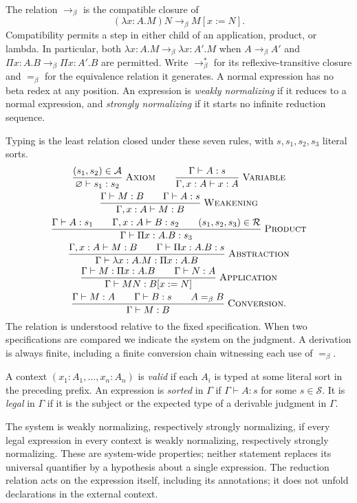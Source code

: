 \begin{definition}\label{pts:beta}
The relation $\to_\beta$ is the compatible closure of
\[
             (\lambda x:A.M)N\to_\beta M[x:=N].
\]
Compatibility permits a step in either child of an application, product,
or lambda. In particular, both
$\lambda x:A.M\to_\beta\lambda x:A'.M$ when $A\to_\beta A'$ and
$\Pi x:A.B\to_\beta\Pi x:A'.B$ are permitted.
Write $\to_\beta^*$ for its reflexive-transitive closure and
$=_\beta$ for the equivalence relation it generates. A normal expression
has no beta redex at any position. An expression is \emph{weakly
normalizing} if it reduces to a normal expression, and \emph{strongly
normalizing} if it starts no infinite reduction sequence.
\end{definition}

Typing is the least relation closed under these seven rules, with
$s,s_1,s_2,s_3$ literal sorts.
\begin{gather*}
 \frac{(s_1,s_2)\in\mathcal A}{\varnothing\vdash s_1:s_2}
 \;\textsc{Axiom}
 \qquad
 \frac{\Gamma\vdash A:s}{\Gamma,x:A\vdash x:A}
 \;\textsc{Variable}
 \\
 \frac{\Gamma\vdash M:B\qquad\Gamma\vdash A:s}
      {\Gamma,x:A\vdash M:B}
 \;\textsc{Weakening}
 \\
 \frac{\Gamma\vdash A:s_1\qquad
       \Gamma,x:A\vdash B:s_2\qquad(s_1,s_2,s_3)\in\mathcal R}
      {\Gamma\vdash\Pi x:A.B:s_3}
 \;\textsc{Product}
 \\
 \frac{\Gamma,x:A\vdash M:B\qquad\Gamma\vdash\Pi x:A.B:s}
      {\Gamma\vdash\lambda x:A.M:\Pi x:A.B}
 \;\textsc{Abstraction}
 \\
 \frac{\Gamma\vdash M:\Pi x:A.B\qquad\Gamma\vdash N:A}
      {\Gamma\vdash MN:B[x:=N]}
 \;\textsc{Application}
 \\
 \frac{\Gamma\vdash M:A\qquad\Gamma\vdash B:s\qquad A=_\beta B}
      {\Gamma\vdash M:B}
 \;\textsc{Conversion}.
\end{gather*}
The relation is understood relative to the fixed specification.
When two specifications are compared we indicate the system on the
judgment. A derivation is always finite, including a finite conversion
chain witnessing each use of $=_\beta$.

\begin{definition}
\label{pts:normalization}
A context $(x_1:A_1,\ldots,x_n:A_n)$ is \emph{valid} if each $A_i$ is
typed at some literal sort in the preceding prefix. An expression is
\emph{sorted} in $\Gamma$ if $\Gamma\vdash A:s$ for some $s\in\mathcal S$.
It is \emph{legal} in $\Gamma$ if it is the subject or the expected type
of a derivable judgment in $\Gamma$.

The system is weakly normalizing, respectively strongly normalizing, if
every legal expression in every context is weakly normalizing,
respectively strongly normalizing. These are system-wide properties;
neither statement replaces its universal quantifier by a hypothesis
about a single expression. The reduction relation acts on the expression
itself, including its annotations; it does not unfold declarations in
the external context.
\end{definition}



